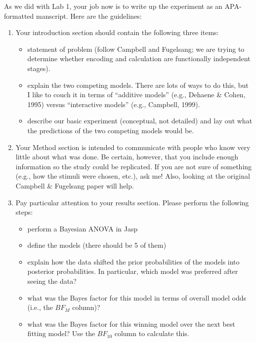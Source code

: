 \documentclass[11pt]{article}
\begin{document}
As we did with Lab 1, your job now is to write up the experiment as an APA-formatted manscript. Here are the guidelines:

\begin{enumerate}
\item Your introduction section should contain the following three items:
\begin{itemize}
\item statement of problem (follow Campbell and Fugelsang; we are trying to determine whether encoding and calculation are functionally independent stages).
\item explain the two competing models. There are lots of ways to do this, but I like to couch it in terms of ``additive models'' (e.g., Dehaene \& Cohen, 1995) versus ``interactive models'' (e.g., Campbell, 1999).
\item describe our basic experiment (conceptual, not detailed) and lay out what the predictions of the two competing models would be.
\end{itemize}

\item Your Method section is intended to communicate with people who know very little about what was done. Be certain, however, that you include enough information so the study could be replicated.  If you are not sure of something (e.g., how the stimuli were chosen, etc.), ask me!  Also, looking at the original Campbell \& Fugelsang paper will help.

\item Pay particular attention to your results section. Please perform the following steps:  
\begin{itemize}
\item perform a Bayesian ANOVA in Jasp
\item define the models (there should be 5 of them)
\item explain how the data shifted the prior probabilities of the models into posterior probabilities.  In particular, which model was preferred after seeing the data?
\item what was the Bayes factor for this model in terms of overall model odds (i.e., the \(BF_M\) column)?
\item what was the Bayes factor for this winning model over the next best fitting model? Use the \(BF_{10}\) column to calculate this.
\end{itemize}
\end{enumerate}
\end{document}
